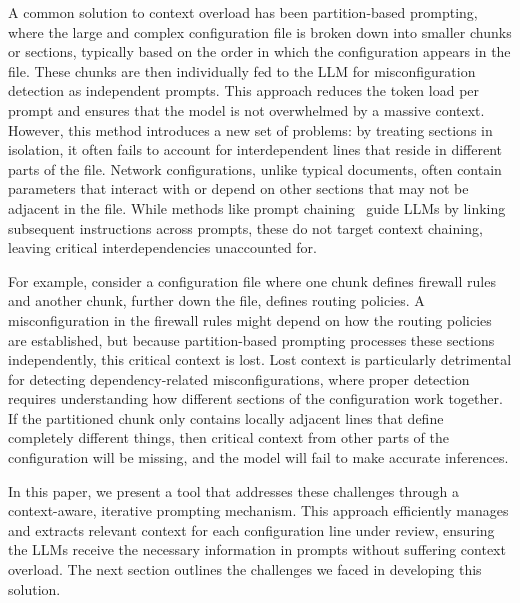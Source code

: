 A common solution to context overload has been partition-based prompting,
where the large and complex configuration file is broken down into smaller
chunks or sections, typically based on the order in which the configuration
appears in the file. These chunks are then individually fed to the LLM for
misconfiguration detection as independent prompts. This approach reduces the
token load per prompt and ensures that the model is not overwhelmed by a
massive context. However, this method introduces a new set of problems: by
treating sections in isolation, it often fails to account for interdependent
lines that reside in different parts of the file. Network configurations,
unlike typical documents, often contain parameters that interact with or
depend on other sections that may not be adjacent in the file. While methods
like prompt chaining~\cite{wang2024identifying,bogdanov2024leveraging} guide
LLMs by linking subsequent instructions across prompts, these do not target
context chaining, leaving critical interdependencies unaccounted for.

For example, consider a configuration file where one chunk defines firewall
rules and another chunk, further down the file, defines routing policies. A
misconfiguration in the firewall rules might depend on how the routing
policies are established, but because partition-based prompting processes
these sections independently, this critical context is lost. Lost context
is particularly detrimental for detecting dependency-related
misconfigurations, where proper detection requires understanding how different
sections of the configuration work together. If the partitioned chunk only
contains locally adjacent lines that define completely different things, then
critical context from other parts of the configuration will be missing, and
the model will fail to make accurate inferences.


In this paper, we present a tool that addresses these challenges through a
context-aware, iterative prompting mechanism. This approach efficiently
manages and extracts relevant context for each configuration line under
review, ensuring the LLMs receive the necessary information in prompts without
suffering context overload. The next section outlines the challenges we faced
in developing this solution.

